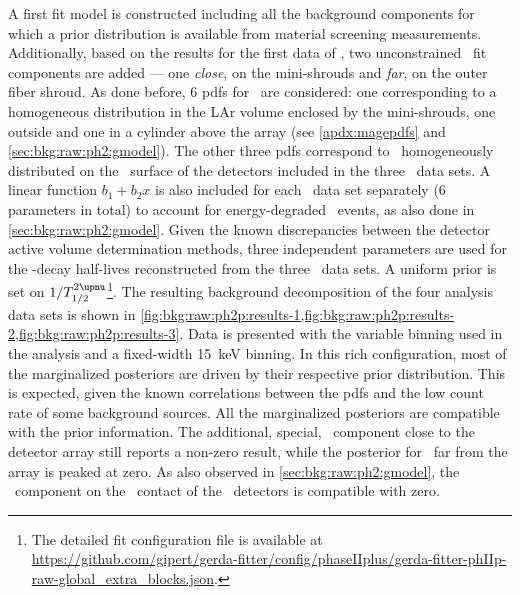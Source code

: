 A first fit model is constructed including all the background components for which a prior
distribution is available from material screening measurements. Additionally, based on the
results for the first data of \phasetwo, two unconstrained \kvn\ fit
components are added --- one \emph{close}, on the mini-shrouds and \emph{far}, on the
outer fiber shroud. As done before, 6 pdfs for \kvz\ are considered: one corresponding to
a homogeneous distribution in the LAr volume enclosed by the mini-shrouds, one outside and
one in a cylinder above the array (see \cref{apdx:magepdfs} and
\cref{sec:bkg:raw:ph2:gmodel}). The other three pdfs correspond to \kvz\ homogeneously
distributed on the \nplus\ surface of the detectors included in the three \Mone\ data
sets. A linear function $b_1+b_2x$ is also included for each \Mone\ data set
separately (6 parameters in total) to account for energy-degraded \a\ events, as also
done in \cref{sec:bkg:raw:ph2:gmodel}. Given the known discrepancies between the detector
active volume determination methods, three independent parameters are used for the
\nnbb-decay half-lives reconstructed from the three \Mone\ data sets. A uniform prior is
set on $1/\thalftwoM$\footnote{%
  The detailed fit configuration file is available at
  \url{https://github.com/gipert/gerda-fitter/config/phaseIIplus/gerda-fitter-phIIp-raw-global_extra_blocks.json}.
}.
\newpar
The resulting background decomposition of the four analysis data sets is shown in
\cref{fig:bkg:raw:ph2p:results-1,fig:bkg:raw:ph2p:results-2,fig:bkg:raw:ph2p:results-3}.
Data is presented with the variable binning used in the analysis and a fixed-width 15~keV
binning. In this rich configuration, most of the marginalized posteriors are driven by
their respective prior distribution. This is expected, given the known correlations
between the pdfs and the low count rate of some background sources. All the marginalized
posteriors are compatible with the prior information. The additional, special, \kvn\
component close to the detector array still reports a non-zero result, while the posterior
for \kvn\ far from the array is peaked at zero. As also observed in
\cref{sec:bkg:raw:ph2:gmodel}, the \kvz\ component on the \nplus\ contact of the \bege\
detectors is compatible with zero.

\begin{sidewaystable}
  \centering
  \footnotesize
  \caption{%
    Summary of the analysis parameter estimates. Global mode and marginalized mode, along
    with its smallest 68\% C.I., are reported as representatives of the posterior
    parameter distribution. The number of reconstructed counts in the fit range and the
    background index at \qbb\ prior active background suppression are listed for each
    component and each analysis data set. The original type of prior distribution is
    marked with \m{[f]} for flat, \m{[g]} for Gaussian and \m{[e]} for exponential.
    \fillme{fillme}
  }\label{tab:bkg:raw:ph2p:gmodel:results}
\end{sidewaystable}

